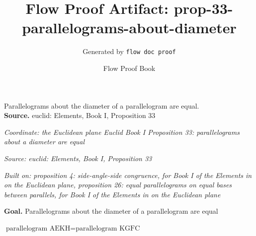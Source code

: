 \documentclass[11pt]{article}
\title{Flow Proof Artifact: prop-33-parallelograms-about-diameter}
\author{Generated by \texttt{flow doc proof}}
\date{Flow Proof Book}
\theoremstyle{definition}
\begin{document}
\maketitle
Parallelograms about the diameter of a parallelogram are equal.\\[0.5em]
\textbf{Source.} euclid: Elements, Book I, Proposition 33\\[0.5em]
\bigskip
{}\par
\smallskip\noindent\textit{Coordinate: the Euclidean plane \cdot Euclid Book I \cdot Proposition 33: parallelograms about a diameter are equal}\par
\smallskip\noindent\textit{Source: euclid: Elements, Book I, Proposition 33}\par
\smallskip\noindent\textit{Built on: proposition 4: side-angle-side congruence, for Book I of the Elements in on the Euclidean plane, proposition 26: equal parallelograms on equal bases between parallels, for Book I of the Elements in on the Euclidean plane}\par
\medskip
\noindent\textbf{Goal.} Parallelograms about the diameter of a parallelogram are equal\par
\noindent$\displaystyle \text{parallelogram AEKH} = \text{parallelogram KGFC}$\par
\medskip
\noindent
\end{document}
